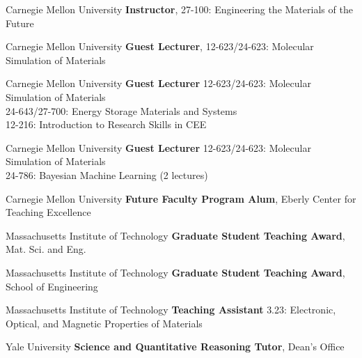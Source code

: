     {Carnegie Mellon University}
    {\textbf{Instructor}, 27-100: Engineering the Materials of the Future}{}

\vspace{-3.5mm}
    {Carnegie Mellon University}
    {\textbf{Guest Lecturer}, 12-623/24-623: Molecular Simulation of Materials}
    {}

\vspace{-3mm}
    {Carnegie Mellon University}
    {\textbf{Guest Lecturer}}
    {12-623/24-623: Molecular Simulation of Materials\\
    24-643/27-700: Energy Storage Materials and Systems\\
    12-216: Introduction to Research Skills in CEE}

\vspace{-3mm}
    {Carnegie Mellon University}
    {\textbf{Guest Lecturer}}
    {12-623/24-623: Molecular Simulation of Materials\\
    24-786: Bayesian Machine Learning (2 lectures)}

\vspace{2.2mm}
\datedsubsectionnarrow{}
    {Carnegie Mellon University}
    {\textbf{Future Faculty Program Alum}, Eberly Center for Teaching Excellence}{}

\vspace{2.2mm}
    {Massachusetts Institute of Technology}
    {\textbf{Graduate Student Teaching Award}, Mat. Sci. and Eng.}{}

\datedsubsectionnarrow{}
    {Massachusetts Institute of Technology}
    {\textbf{Graduate Student Teaching Award}, School of Engineering}{}

\vspace{-3mm}
    {Massachusetts Institute of Technology}
    {\textbf{Teaching Assistant}}
    {3.23: Electronic, Optical, and Magnetic Properties of Materials}

\vspace{2.2mm}
    {Yale University}
    {\textbf{Science and Quantitative Reasoning Tutor}, Dean's Office}{}